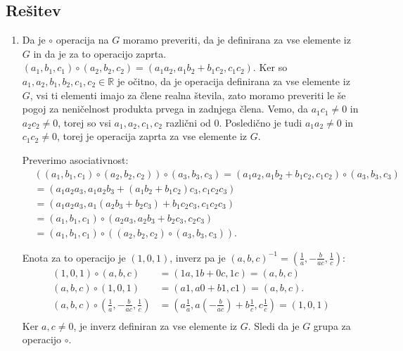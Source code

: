 \documentclass[a4,11pt]{article}
\newcommand{\R}{\mathbb{R}}
\begin{document}
\subsection*{Rešitev}
\begin{enumerate}[label=(\alph*)]
    \item Da je \(\circ\) operacija na \(G\) moramo preveriti, da je definirana za vse elemente iz \(G\)
    in da je za to operacijo zaprta.  \(\left(a_1, b_1, c_1\right) \circ \left(a_2, b_2, c_2\right) = \left(a_1a_2, a_1b_2 + b_1c_2, c_1c_2\right)\).
    Ker so \(a_1, a_2, b_1, b_2, c_1, c_2 \in \R\) je očitno, da je operacija definirana za vse elemente iz \(G\), vsi ti elementi imajo za člene
    realna števila, zato moramo preveriti le še pogoj za neničelnost produkta prvega in zadnjega člena.
    Vemo, da \(a_1c_1 \ne 0\) in \(a_2c_2 \ne 0\), torej so vsi \(a_1, a_2, c_1, c_2\) različni od \(0\). Posledično je tudi 
    \(a_1a_2\ne 0\) in \(c_1c_2 \ne 0\), torej je operacija zaprta za vse elemente iz \(G\).

    Preverimo asociativnost:
    \begin{align*}    
        & \left(\left(a_1, b_1, c_1\right) \circ \left(a_2, b_2, c_2\right)\right) \circ \left(a_3, b_3, c_3\right) =
        \left(a_1a_2, a_1b_2 + b_1c_2, c_1c_2\right) \circ \left(a_3, b_3, c_3\right) \\
        & = \left(a_1a_2a_3, a_1a_2b_3 + \left(a_1b_2 + b_1c_2\right)c_3, c_1c_2c_3\right) \\
        & = \left(a_1a_2a_3, a_1\left(a_2b_3 + b_2c_3\right) + b_1c_2c_3, c_1c_2c_3\right) \\
        & = \left(a_1, b_1, c_1\right) \circ \left(a_2a_3, a_2b_3 + b_2c_3, c_2c_3\right) \\
        & = \left(a_1, b_1, c_1\right) \circ \left(\left(a_2, b_2, c_2\right) \circ \left(a_3, b_3, c_3\right)\right).
    \end{align*}

    Enota za to operacijo je \(\left(1, 0, 1\right)\), inverz pa je \(\left(a, b, c\right)^{-1} = \left(\frac{1}{a}, -\frac{b}{ac}, \frac{1}{c}\right)\):
    \begin{align*}        
        \left(1, 0, 1\right) \circ \left(a, b, c\right) & = \left(1a, 1b + 0c, 1c\right) = \left(a, b, c\right) \\
        \left(a, b, c\right) \circ \left(1, 0, 1\right) & = \left(a1, a0 + b1, c1\right) = \left(a, b, c\right). \\
        \left(a, b, c\right) \circ \left(\frac{1}{a}, -\frac{b}{ac}, \frac{1}{c}\right) & = \left(a\frac{1}{a}, a\left(-\frac{b}{ac}\right) + b\frac{1}{c}, c\frac{1}{c}\right) = \left(1, 0, 1\right) \\
    \end{align*}
    Ker \(a, c \ne 0\), je inverz definiran za vse elemente iz \(G\). Sledi da je \(G\) grupa za operacijo \(\circ\).


\end{enumerate}
\end{document}
